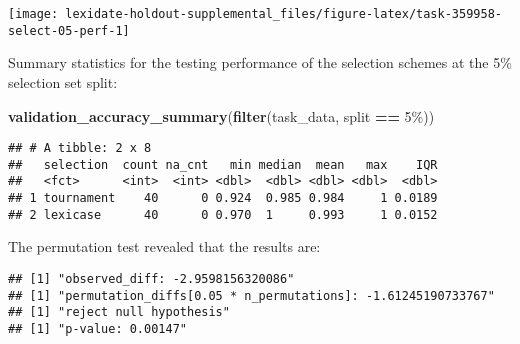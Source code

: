 \documentclass[
]{book}
\newenvironment{Shaded}{\begin{snugshade}}{\end{snugshade}}
\newcommand{\AttributeTok}[1]{\textcolor[rgb]{0.13,0.29,0.53}{#1}}
\newcommand{\DecValTok}[1]{\textcolor[rgb]{0.00,0.00,0.81}{#1}}
\newcommand{\FunctionTok}[1]{\textcolor[rgb]{0.13,0.29,0.53}{\textbf{#1}}}
\newcommand{\NormalTok}[1]{#1}
\newcommand{\OtherTok}[1]{\textcolor[rgb]{0.56,0.35,0.01}{#1}}
\newcommand{\SpecialCharTok}[1]{\textcolor[rgb]{0.81,0.36,0.00}{\textbf{#1}}}
\newcommand{\StringTok}[1]{\textcolor[rgb]{0.31,0.60,0.02}{#1}}
\begin{document}
\texttt{[image: lexidate-holdout-supplemental\_files/figure-latex/task-359958-select-05-perf-1]}

Summary statistics for the testing performance of the selection schemes at the 5\% selection set split:

\begin{Shaded}
\begin{Highlighting}[]
\FunctionTok{validation\_accuracy\_summary}\NormalTok{(}\FunctionTok{filter}\NormalTok{(task\_data, split }\SpecialCharTok{==} \StringTok{\textquotesingle{}5\%\textquotesingle{}}\NormalTok{))}
\end{Highlighting}
\end{Shaded}

\begin{verbatim}
## # A tibble: 2 x 8
##   selection  count na_cnt   min median  mean   max    IQR
##   <fct>      <int>  <int> <dbl>  <dbl> <dbl> <dbl>  <dbl>
## 1 tournament    40      0 0.924  0.985 0.984     1 0.0189
## 2 lexicase      40      0 0.970  1     0.993     1 0.0152
\end{verbatim}

The permutation test revealed that the results are:

\begin{Shaded}
\end{Shaded}

\begin{verbatim}
## [1] "observed_diff: -2.9598156320086"
## [1] "permutation_diffs[0.05 * n_permutations]: -1.61245190733767"
## [1] "reject null hypothesis"
## [1] "p-value: 0.00147"
\end{verbatim}
\end{document}
